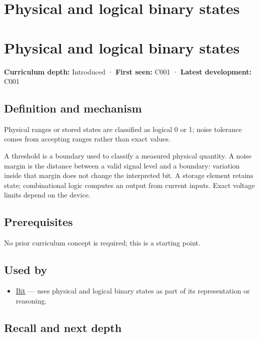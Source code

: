 \hypertarget{appendix-ea798b1ceb35}{}
\section*{Physical and logical binary states}
\section{Physical and logical binary states}\label{appendix-ea798b1ceb35-physical-and-logical-binary-states}

\textbf{Curriculum depth:} Introduced · \textbf{First seen:} C001 · \textbf{Latest development:} C001

\subsection{Definition and mechanism}\label{appendix-ea798b1ceb35-definition-and-mechanism}

Physical ranges or stored states are classified as logical 0 or 1; noise tolerance comes from accepting ranges rather than exact values.

A threshold is a boundary used to classify a measured physical quantity. A noise margin is the distance between a valid signal level and a boundary: variation inside that margin does not change the interpreted bit. A storage element retains state; combinational logic computes an output from current inputs. Exact voltage limits depend on the device.

\subsection{Prerequisites}\label{appendix-ea798b1ceb35-prerequisites}

No prior curriculum concept is required; this is a starting point.

\subsection{Used by}\label{appendix-ea798b1ceb35-used-by}

\begin{itemize}
\tightlist
\item
  \hyperref[appendix-ddbb69998a2e]{Bit} --- uses physical and logical binary states as part of its representation or reasoning.
\end{itemize}

\subsection{Recall and next depth}\label{appendix-ea798b1ceb35-recall-and-next-depth}

